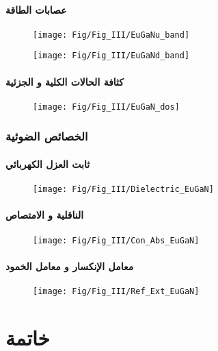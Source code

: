 \subsubsection{عصابات الطاقة}

\begin{figure}[h!]
	\centering
	\texttt{[image: Fig/Fig\_III/EuGaNu\_band]}
	\caption{}
	\label{fig:euganuband}
\end{figure}
\FloatBarrier
\begin{figure}[h!]
	\centering
	\texttt{[image: Fig/Fig\_III/EuGaNd\_band]}
	\caption{}
	\label{fig:euganuband}
\end{figure}
\FloatBarrier
\subsubsection{كثافة الحالات الكلية و الجزئية}
\begin{figure}[h!]
	\centering
	\texttt{[image: Fig/Fig\_III/EuGaN\_dos]}
	\caption{}
	\label{fig:eugandos}
\end{figure}
\FloatBarrier
\subsection{الخصائص الضوئية}
\subsubsection{ثابت العزل الكهربائي }
\begin{figure}[h!]
	\centering
	\texttt{[image: Fig/Fig\_III/Dielectric\_EuGaN]}
	\caption{}
	\label{fig:dielectriceugan}
\end{figure}
\FloatBarrier
\subsubsection{الناقلية و الامتصاص}
\begin{figure}[h!]
	\centering
	\texttt{[image: Fig/Fig\_III/Con\_Abs\_EuGaN]}
	\caption{}
	\label{fig:conabseugan}
\end{figure}
\FloatBarrier
\subsubsection{معامل الإنكسار و معامل الخمود}
\begin{figure}[h!]
	\centering
	\texttt{[image: Fig/Fig\_III/Ref\_Ext\_EuGaN]}
	\caption{}
	\label{fig:refexteugan}
\end{figure}
\FloatBarrier
\chapter*{  خاتمة }